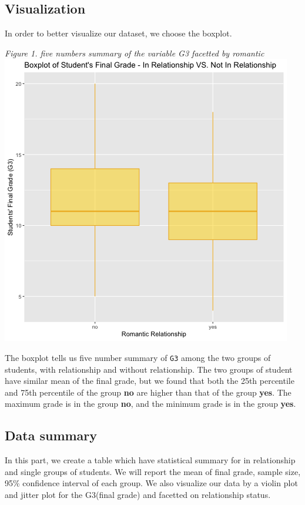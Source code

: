 \documentclass[]{article}
\begin{document}
\subsection{Visualization}\label{visualization}

In order to better visualize our dataset, we choose the boxplot.

\emph{Figure 1. five numbers summary of the variable G3 facetted by
romantic} \includegraphics{../results/boxplot.png}

The boxplot tells us five number summary of \texttt{G3} among the two
groups of students, with relationship and without relationship. The two
groups of student have similar mean of the final grade, but we found
that both the 25th percentile and 75th percentile of the group
\textbf{no} are higher than that of the group \textbf{yes}. The maximum
grade is in the group \textbf{no}, and the minimum grade is in the group
\textbf{yes}.

\subsection{Data summary}\label{data-summary}

In this part, we create a table which have statistical summary for in
relationship and single groups of students. We will report the mean of
final grade, sample size, 95\% confidence interval of each group. We
also visualize our data by a violin plot and jitter plot for the
G3(final grade) and facetted on relationship status.
\end{document}
